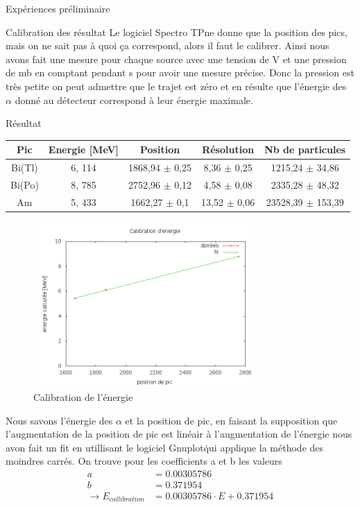 \documentclass[a4paper,11pt,liststotocnumbered,bibtotocnumbered]{scrartcl}
\begin{document}
\begin{section}{Expériences préliminaire}
  \begin{subsection}{Calibration des résultat}
   Le logiciel \flqq Spectro TP\frqq ne donne que la position des pics, mais on ne sait pas à quoi \c ca correspond, alors il faut le calibrer. Ainsi nous avons fait une mesure pour chaque source avec une tension de \unit[80]{V} et une pression de \unit[0,78]{mb} en comptant pendant \unit[300]{s} pour avoir une mesure précise. Donc la pression est très petite on peut admettre que le trajet est zéro et en résulte que l'énergie des $\alpha$ donné au détecteur correspond à leur énergie maximale.
   \begin{paragraph}{Résultat}
    \begin{center}
     \begin{tabular}{c|c|c|c|c}
      Pic	& Energie [MeV] &	Position	&	Résolution	&	Nb de particules	\\ \hline
      Bi(Tl)	&6, 114	 &1868,94 $\pm$ 0,25 	&8,36 $\pm$ 0,25	&1215,24 $\pm$ 34,86	\\
      Bi(Po)	&8, 785	&2752,96 $\pm$ 0,12	&4,58 $\pm$ 0,08	&2335,28 $\pm$ 48,32	\\ 
      Am	&5, 433 &1662,27 $\pm$ 0,1	&13,52 $\pm$ 0,06	&23528,39 $\pm$ 153,39	\\ 
     \end{tabular}
    \end{center}
    \begin{figure}[H]
     \begin{center}
      \includegraphics[width=0.75\textwidth]{Bilder/calibration.png}
      \caption{Calibration de l'énergie}
     \end{center}
    \end{figure}
   \end{paragraph}
   Nous savons l'énergie des $\alpha$ et la position de pic, en faisant la supposition que l'augmentation de la position de pic est linéair à l'augmentation de l'énergie nous avon fait un fit en utillisant le logiciel \flqq Gnuplot\frqq\. qui applique la méthode des moindres carrés. On trouve pour les coefficients a et b les valeurs
   \begin{align*}
    a&= 0.00305786 \\
    b&= 0.371954 \\
    \rightarrow E_{callibration} &= 0.00305786  \cdot E +0.371954 
   \end{align*}
  \end{subsection}


\end{section}
\end{document}
